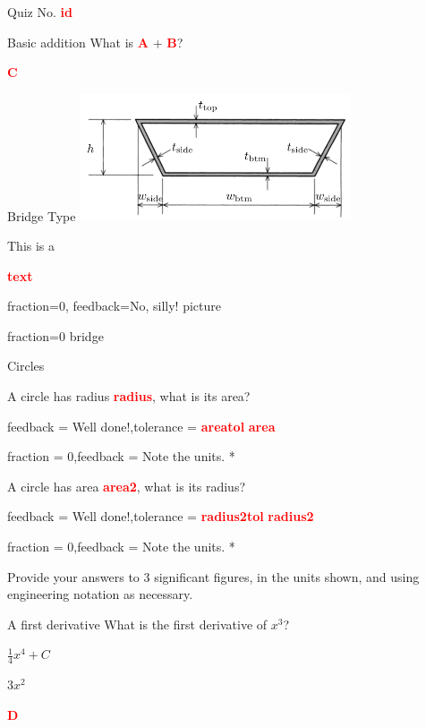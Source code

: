 \documentclass[12pt]{article}
\newcommand*{\VAR}[1]{\textcolor{red}{\textbf{#1}}}
\begin{document}
\begin{quiz}{Quiz No. \VAR{id}}
	
\begin{numerical}[points=2]{Basic addition}
	What is \VAR{A} + \VAR{B}?	
	\item \VAR{C}
\end{numerical}

\begin{shortanswer}[case sensitive=true]{Bridge Type}
	\includegraphics[width=8cm]{./media/image1}
	
	This is a
	\item* \VAR{text}
	\item[fraction=0, feedback={No, silly!}] picture
	\item[fraction=0] bridge
\end{shortanswer}
	
\begin{cloze}[feedback=Please hover to see specific feedback]{Circles} 
	
	A circle has radius \VAR{radius}, what is its area?
	
	\begin{numerical}[points=1,penalty=0]
		\item[feedback = {Well done!},tolerance = \VAR{areatol}] \VAR{area}
		\item[fraction = 0,feedback = {Note the units.}] * %
	\end{numerical}

	A circle has area \VAR{area2}, what is its radius?

	\begin{numerical}[points=1,penalty=0]
		\item[feedback = {Well done!},tolerance = \VAR{radius2tol}] \VAR{radius2}
		\item[fraction = 0,feedback = {Note the units.}] * %
	\end{numerical}	
	
	Provide your answers to 3 significant figures, in the units shown, and using engineering notation as necessary.
	
\end{cloze}

\begin{multi}[points=3]{A first derivative}
What is the first derivative of $x^3$?
\item $\frac{1}{4} x^4+C$
\item* $3x^2$
\item \VAR{D}
\end{multi}

\end{quiz}
\end{document}
